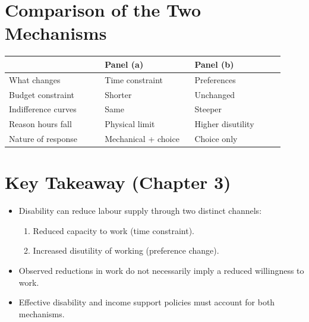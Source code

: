 \documentclass[12pt]{article}
\begin{document}
\section*{Comparison of the Two Mechanisms}

\begin{center}
\begin{tabular}{p{0.32\linewidth} p{0.3\linewidth} p{0.3\linewidth}}
\hline
 & \textbf{Panel (a)} & \textbf{Panel (b)} \\
\hline
What changes & Time constraint & Preferences \\
Budget constraint & Shorter & Unchanged \\
Indifference curves & Same & Steeper \\
Reason hours fall & Physical limit & Higher disutility \\
Nature of response & Mechanical + choice & Choice only \\
\hline
\end{tabular}
\end{center}

\vspace{0.5em}

\section*{Key Takeaway (Chapter 3)}

\begin{itemize}
\item Disability can reduce labour supply through two distinct channels:
  \begin{enumerate}
  \item Reduced capacity to work (time constraint).
  \item Increased disutility of working (preference change).
  \end{enumerate}
\item Observed reductions in work do not necessarily imply a reduced willingness to work.
\item Effective disability and income support policies must account for both mechanisms.
\end{itemize}
\end{document}
